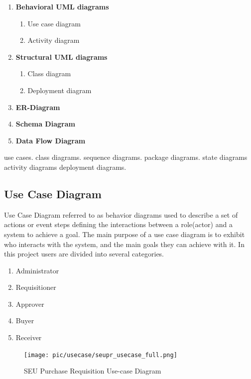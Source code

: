 \documentclass[12pt]{report} %
\begin{document}
\renewcommand{\labelenumi}{\alph{enumi})}
\begin{enumerate}


	\item \textbf{Behavioral UML diagrams}
	\begin{enumerate}
		\item Use case diagram
		\item Activity diagram
	\end{enumerate}
	
	\item \textbf{Structural UML diagrams}
	\begin{enumerate}
		\item Class diagram
		\item Deployment diagram
	\end{enumerate}
	\item \textbf{ER-Diagram}
	\item \textbf{Schema Diagram}
	\item \textbf{Data Flow Diagram}
\end{enumerate}


\ifx
use cases.
class diagrams.
sequence diagrams.
package diagrams.
state diagrams
activity diagrams
deployment diagrams.

\fi


\subsection{Use Case Diagram}
Use Case Diagram referred to as behavior diagrams used to describe a set of actions or event steps defining the interactions between a role(actor) and a system to achieve a goal. The main purpose of a use case diagram is to exhibit who interacts with the system, and the main goals they can achieve with it.
In this project users are divided into several categories.
\renewcommand{\labelenumi}{\alph{enumi})}
\begin{enumerate}


		\item Administrator
		\item Requisitioner
		\item Approver
		\item Buyer
		\item Receiver
\end{enumerate}


\begin{center}
\begin{figure}[h]
	\begin{center}
	\texttt{[image: pic/usecase/seupr\_usecase\_full.png]}
	\end{center}
	\caption{SEU Purchase Requisition Use-case Diagram}
	\label{fig:seupr_usecase_full}
\end{figure}
\end{center}
\clearpage
\end{document}
